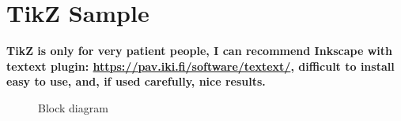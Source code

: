 \section{TikZ Sample}

\textbf{TikZ is only for very patient people, I can recommend Inkscape with textext plugin: \url{https://pav.iki.fi/software/textext/}, difficult to install easy to use, and, if used carefully, nice results.}



\begin{figure}[H]
	
	\centering
	\caption{Block diagram}
\end{figure}




\pagebreak